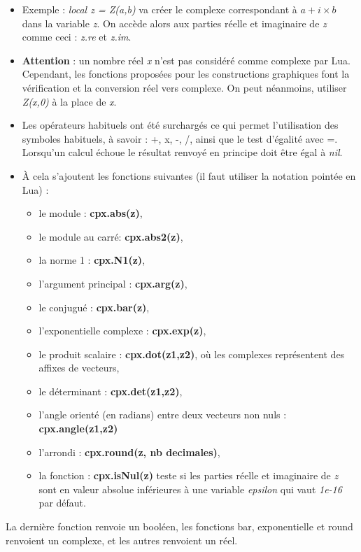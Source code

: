 \begin{itemize}
\item Exemple : \emph{local z = Z(a,b)} va créer le complexe correspondant à \(a+i\times b\) dans la variable \emph{z}. On accède alors aux parties réelle et imaginaire de \emph{z} comme ceci : \emph{z.re} et \emph{z.im}.
\item \textbf{Attention} : un nombre réel \emph{x} n'est pas considéré comme complexe par Lua. Cependant, les fonctions proposées pour les constructions graphiques font la vérification et la conversion réel vers complexe. On peut néanmoins, utiliser \emph{Z(x,0)} à la place de \emph{x}.
\item Les opérateurs habituels ont été surchargés ce qui permet l'utilisation des symboles habituels, à savoir : +, x, -, /, ainsi que le test d'égalité avec =. Lorsqu'un calcul échoue le résultat renvoyé en principe doit être égal à \emph{nil}.
\item À cela s'ajoutent les fonctions suivantes (il faut utiliser la notation pointée en Lua) :
  \begin{itemize}
  \item le module : \textbf{cpx.abs(z)},
  \item le module au carré: \textbf{cpx.abs2(z)},
  \item la norme 1 : \textbf{cpx.N1(z)},
  \item l'argument principal : \textbf{cpx.arg(z)},
  \item le conjugué : \textbf{cpx.bar(z)},
  \item l'exponentielle complexe : \textbf{cpx.exp(z)},
  \item le produit scalaire : \textbf{cpx.dot(z1,z2)}, où les complexes représentent des affixes de vecteurs,
  \item le déterminant : \textbf{cpx.det(z1,z2)},
  \item l'angle orienté (en radians) entre deux vecteurs non nuls : \textbf{cpx.angle(z1,z2)}
  \item l'arrondi : \textbf{cpx.round(z, nb decimales)},
  \item la fonction : \textbf{cpx.isNul(z)} teste si les parties réelle et imaginaire de \emph{z} sont en valeur absolue inférieures à une variable \emph{epsilon} qui vaut \emph{1e-16} par défaut.
  \end{itemize}
\end{itemize}

La dernière fonction renvoie un booléen, les fonctions bar, exponentielle et round renvoient un complexe, et les autres renvoient un réel.

